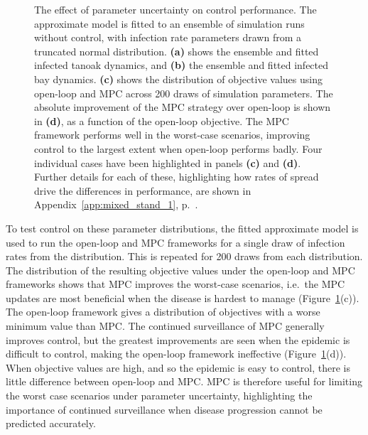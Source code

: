 \begin{figure}[t]
    \begin{center}
        \caption[Effect of parameter uncertainty on control performance]{The effect of parameter uncertainty on control performance. The approximate model is fitted to an ensemble of simulation runs without control, with infection rate parameters drawn from a truncated normal distribution. \textbf{(a)} shows the ensemble and fitted infected tanoak dynamics, and \textbf{(b)} the ensemble and fitted infected bay dynamics. \textbf{(c)} shows the distribution of objective values using open-loop and MPC across 200 draws of simulation parameters. The absolute improvement of the MPC strategy over open-loop is shown in \textbf{(d)}, as a function of the open-loop objective. The MPC framework performs well in the worst-case scenarios, improving control to the largest extent when open-loop performs badly. Four individual cases have been highlighted in panels \textbf{(c)} and \textbf{(d)}. Further details for each of these, highlighting how rates of spread drive the differences in performance, are shown in Appendix~\ref{app:mixed_stand_1}, p.~\pageref{app:mixed_stand_1}.\label{fig:ch6:param_uncert}}
    \end{center}
\end{figure}

To test control on these parameter distributions, the fitted approximate model is used to run the open-loop and MPC frameworks for a single draw of infection rates from the distribution. This is repeated for 200 draws from each distribution. The distribution of the resulting objective values under the open-loop and MPC frameworks shows that MPC improves the worst-case scenarios, i.e.\ the MPC updates are most beneficial when the disease is hardest to manage (Figure~\ref{fig:ch6:param_uncert}(c)). The open-loop framework gives a distribution of objectives with a worse minimum value than MPC. The continued surveillance of MPC generally improves control, but the greatest improvements are seen when the epidemic is difficult to control, making the open-loop framework ineffective (Figure~\ref{fig:ch6:param_uncert}(d)). When objective values are high, and so the epidemic is easy to control, there is little difference between open-loop and MPC. MPC is therefore useful for limiting the worst case scenarios under parameter uncertainty, highlighting the importance of continued surveillance when disease progression cannot be predicted accurately.

